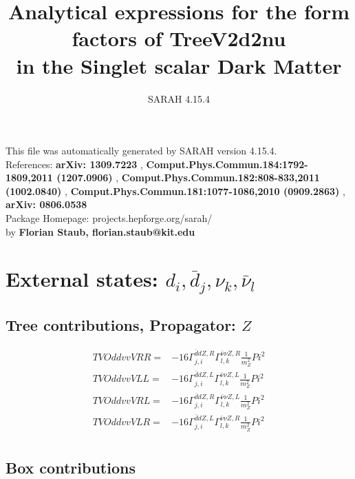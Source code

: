 \documentclass[A4,landscape]{article}
\begin{document}
\title{Analytical expressions for the form factors of TreeV2d2nu\\ in the Singlet scalar Dark Matter } 
 \author{SARAH 4.15.4} 
 \maketitle 
 \vspace{10cm} 
This file was automatically generated by SARAH version 4.15.4.  \\ 
References: {\bf arXiv: 1309.7223 }, {\bf Comput.Phys.Commun.184:1792-1809,2011 (1207.0906) }, {\bf Comput.Phys.Commun.182:808-833,2011 (1002.0840) }, {\bf Comput.Phys.Commun.181:1077-1086,2010 (0909.2863) }, {\bf arXiv: 0806.0538 } \\ 
Package Homepage: projects.hepforge.org/sarah/ \\ 
by {\bf Florian Staub, florian.staub@kit.edu} 
 \pagebreak 
 \tableofcontents 
 \pagebreak 
\section{External states: ${d_{{i}}, \bar{d}_{{j}}, \nu_{{k}}, \bar{\nu}_{{l}}}$} 
\subsection{Tree contributions, Propagator: $Z$} 

\begin{align} 
  TVOddvvVRR= & -16 \Gamma^{\bar{d}d Z ,R}_{j, i} \Gamma^{\bar{\nu}\nu Z ,R}_{l, k} \frac{1}{m^2_{Z}} Pi^2 \\ 
  TVOddvvVLL= & -16 \Gamma^{\bar{d}d Z ,L}_{j, i} \Gamma^{\bar{\nu}\nu Z ,L}_{l, k} \frac{1}{m^2_{Z}} Pi^2 \\ 
  TVOddvvVRL= & -16 \Gamma^{\bar{d}d Z ,R}_{j, i} \Gamma^{\bar{\nu}\nu Z ,L}_{l, k} \frac{1}{m^2_{Z}} Pi^2 \\ 
  TVOddvvVLR= & -16 \Gamma^{\bar{d}d Z ,L}_{j, i} \Gamma^{\bar{\nu}\nu Z ,R}_{l, k} \frac{1}{m^2_{Z}} Pi^2 \\ 
\end{align} 
\subsection{Box contributions} 
\end{document}
